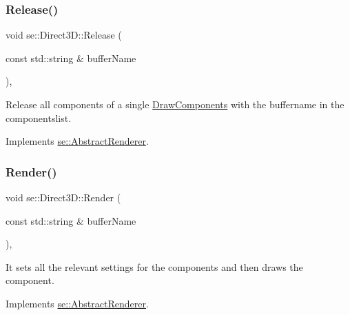 \subsubsection{\texorpdfstring{Release()}{Release()}\hspace{0.1cm}{\footnotesize\ttfamily [2/2]}}
{\footnotesize\ttfamily void se\+::\+Direct3\+D\+::\+Release (\begin{DoxyParamCaption}\item[{const std\+::string \&}]{buffer\+Name }\end{DoxyParamCaption})\hspace{0.3cm}{\ttfamily [override]}, {\ttfamily [virtual]}}

Release all components of a single \mbox{\hyperlink{structse_1_1_draw_components}{Draw\+Components}} with the buffername in the componentslist. 

Implements \mbox{\hyperlink{classse_1_1_abstract_renderer_af6d6d012f070f95d4c49713002872fcc}{se\+::\+Abstract\+Renderer}}.

\mbox{\label{classse_1_1_direct3_d_a31e3c97cd8ceeaea58017b66bd60b9d7}} 
\subsubsection{\texorpdfstring{Render()}{Render()}}
{\footnotesize\ttfamily void se\+::\+Direct3\+D\+::\+Render (\begin{DoxyParamCaption}\item[{const std\+::string \&}]{buffer\+Name }\end{DoxyParamCaption})\hspace{0.3cm}{\ttfamily [override]}, {\ttfamily [virtual]}}

It sets all the relevant settings for the components and then draws the component. 

Implements \mbox{\hyperlink{classse_1_1_abstract_renderer_a76058a91574874ab3c51294a2c9ea85c}{se\+::\+Abstract\+Renderer}}.

\mbox{\label{classse_1_1_direct3_d_a0294b31c151540af98c78d1e33cb369a}} 
